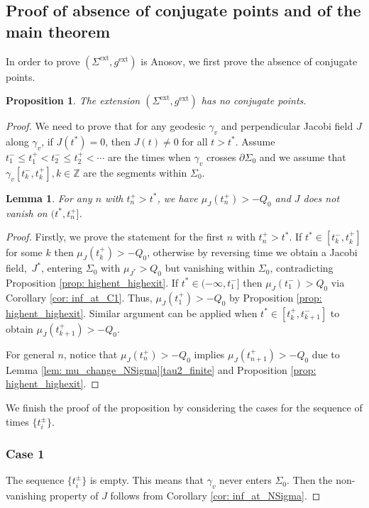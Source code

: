 \documentclass[JEP,XML,SOM,Unicode,NoFloatCountersInSection]{cedram}
\newcommand{\ext}{\mathrm{ext}}
\newtheorem{lemma}[theorem]{Lemma}
\newtheorem{proposition}[theorem]{Proposition}
\theoremstyle{definition}
\renewcommand{\>}{{\rangle}}
\newcommand{\<}{{\langle}}
\begin{document}
\subsection{Proof of absence of conjugate points and of the main theorem}\label{section: absence of conjugate points and the main theorem}
In order to prove $(\Sigma^{\ext}, g^{\ext})$ is Anosov, we first prove the absence of conjugate points.
\begin{proposition}\label{prop: noconjpts}
The extension $(\Sigma^{\ext}, g^{\ext})$ has no conjugate points.
\end{proposition}
\begin{proof}
We need to prove that for any geodesic $\gamma_v$ and perpendicular Jacobi field $J$ along $\gamma_v$, if $J(t^*)=0$, then $J(t)\neq 0$ for all $t>t^*$. Assume $t^-_1\leq t^+_1<t^-_2\leq t^+_2<\cdots$ are the times when $\gamma_v$ crosses $\partial\Sigma_0$ and we assume that $\gamma_v[t^-_k, t^+_k], k\in\mathbb{Z}$ are the segments within $\Sigma_0$.

\begin{lemma}\label{lem: t*<t+n}
For any $n$ with $t^+_n>t^*$, we have $\mu_J(t^+_{n})>-Q_0$ and $J$ does not vanish on $(t^*, t^+_n]$.
\end{lemma}
\begin{proof}
Firstly, we prove the statement for the first $n$ with $t^+_n>t^*$. If $t^*\in [t^-_k, t^+_k]$ for some $k$ then $\mu_J(t^+_k)>-Q_0$, otherwise by reversing time we obtain a Jacobi field,~$J^*$, entering $\Sigma_0$ with $\mu_{J^*}>Q_0$ but vanishing within $\Sigma_0$, contradicting Proposition \ref{prop: highent_highexit}. If $t^*\in (-\infty, t^-_1]$ then $\mu_J(t^-_{1})>Q_0$ via Corollary \ref{cor: inf_at_C1}. Thus, $\mu_J(t^+_{1})>-Q_0$ by Proposition \ref{prop: highent_highexit}. Similar argument can be applied when $t^*\in [t^+_k, t^-_{k+1}]$ to obtain $\mu_J(t^+_{k+1})>-Q_0$.

For general $n$, notice that $\mu_J(t^+_{n})>-Q_0$ implies $\mu_J(t^+_{n+1})>-Q_0$ due to Lemma \ref{lem: mu_change_NSigma}\eqref{tau2_finite} and Proposition \ref{prop: highent_highexit}.
\end{proof}

We finish the proof of the proposition by considering the cases for the sequence of times $\{t_i^{\pm}\}$.

\subsubsection*{Case 1} The sequence $\{t_i^{\pm}\}$ is empty. This means that $\gamma_v$ never enters $\Sigma_0$. Then the non-vanishing property of $J$ follows from Corollary \ref{cor: inf_at_NSigma}.


\end{proof}
\end{document}
